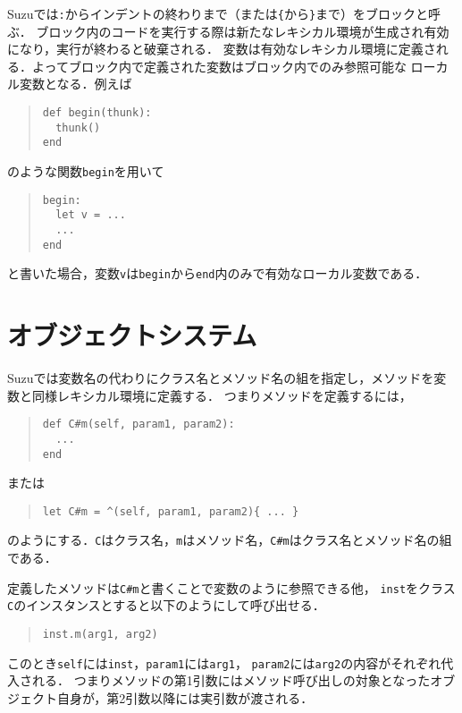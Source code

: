 \documentclass[a4paper,11pt,dvipdfmx]{jreport}
\begin{document}
Suzuでは\verb|:|からインデントの終わりまで（または\verb|{|から\verb|}|まで）をブロックと呼ぶ．
ブロック内のコードを実行する際は新たなレキシカル環境が生成され有効になり，実行が終わると破棄される．
変数は有効なレキシカル環境に定義される．よってブロック内で定義された変数はブロック内でのみ参照可能な
ローカル変数となる．例えば
\begin{quote}
\begin{verbatim}
def begin(thunk):
  thunk()
end
\end{verbatim}
\end{quote}
のような関数\verb|begin|を用いて
\begin{quote}
\begin{verbatim}
begin:
  let v = ...
  ...
end
\end{verbatim}
\end{quote}
と書いた場合，変数\verb|v|は\verb|begin|から\verb|end|内のみで有効なローカル変数である．

\section{オブジェクトシステム}

Suzuでは変数名の代わりにクラス名とメソッド名の組を指定し，メソッドを変数と同様レキシカル環境に定義する．
つまりメソッドを定義するには，
\begin{quote}
\begin{verbatim}
def C#m(self, param1, param2):
  ...
end
\end{verbatim}
\end{quote}
または
\begin{quote}
\begin{verbatim}
let C#m = ^(self, param1, param2){ ... }
\end{verbatim}
\end{quote}
のようにする．\verb|C|はクラス名，\verb|m|はメソッド名，\verb|C#m|はクラス名とメソッド名の組である．

定義したメソッドは\verb|C#m|と書くことで変数のように参照できる他，
\verb|inst|をクラス\verb|C|のインスタンスとすると以下のようにして呼び出せる．
\begin{quote}
\begin{verbatim}
inst.m(arg1, arg2)
\end{verbatim}
\end{quote}
このとき\verb|self|には\verb|inst|，\verb|param1|には\verb|arg1|，
\verb|param2|には\verb|arg2|の内容がそれぞれ代入される．
つまりメソッドの第1引数にはメソッド呼び出しの対象となったオブジェクト自身が，第2引数以降には実引数が渡される．
\end{document}
